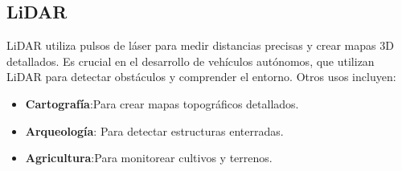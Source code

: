 \subsection{LiDAR}
LiDAR utiliza pulsos de láser para medir distancias precisas y crear mapas 3D detallados. Es crucial en el desarrollo de vehículos autónomos, que utilizan LiDAR para detectar obstáculos y comprender el entorno. Otros usos incluyen:
\begin{itemize}
	\item \textbf{Cartografía}:Para crear mapas topográficos detallados.
	\item \textbf{Arqueología}: Para detectar estructuras enterradas.
	\item \textbf{Agricultura}:Para monitorear cultivos y terrenos.
	
\end{itemize}\newpage